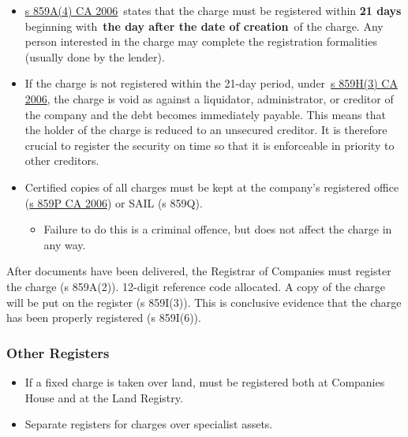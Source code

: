 \documentclass[
]{article}
\providecommand{\tightlist}{%
  \setlength{\itemsep}{0pt}\setlength{\parskip}{0pt}}
\begin{document}
\begin{itemize}
\tightlist
\item
  \href{https://www.legislation.gov.uk/ukpga/2006/46/section/859A}{s
  859A(4) CA 2006}~states that the charge must be registered within
  \textbf{21 days} beginning with~\textbf{the day after the date of
  creation}~of the charge. Any person interested in the charge may
  complete the registration formalities (usually done by the lender).
\item
  If the charge is not registered within the 21-day period,
  under~\href{https://www.legislation.gov.uk/ukpga/2006/46/section/859H}{s
  859H(3) CA 2006}, the charge is void as against a liquidator,
  administrator, or creditor of the company and the debt becomes
  immediately payable. This means that the holder of the charge is
  reduced to an unsecured creditor. It is therefore crucial to register
  the security on time so that it is enforceable in priority to other
  creditors.
\item
  Certified copies of all charges must be kept at the company's
  registered office
  (\href{https://www.legislation.gov.uk/ukpga/2006/46/section/859P}{s
  859P CA 2006}) or SAIL (s 859Q).

  \begin{itemize}
  \tightlist
  \item
    Failure to do this is a criminal offence, but does not affect the
    charge in any way.
  \end{itemize}
\end{itemize}

After documents have been delivered, the Registrar of Companies must
register the charge (s 859A(2)). 12-digit reference code allocated. A
copy of the charge will be put on the register (s 859I(3)). This is
conclusive evidence that the charge has been properly registered (s
859I(6)).

\hypertarget{other-registers}{%
\subsubsection{Other Registers}\label{other-registers}}

\begin{itemize}
\tightlist
\item
  If a fixed charge is taken over land, must be registered both at
  Companies House and at the Land Registry.
\item
  Separate registers for charges over specialist assets.
\end{itemize}
\end{document}
